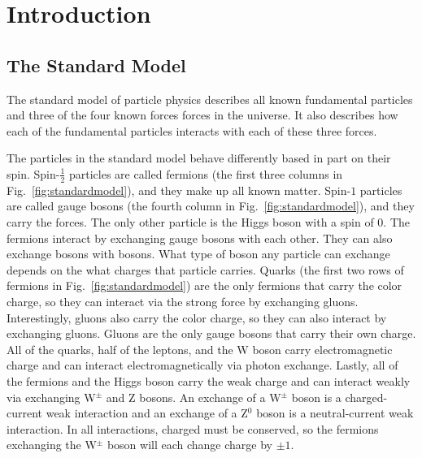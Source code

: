 \section{Introduction} \label{sec:intro}
\hspace{\parindent}

\subsection{The Standard Model}\label{sec:standardmodel}
  The standard model of particle physics describes all known fundamental
  particles and three of the four known forces forces in the universe. It also
  describes how each of the fundamental particles interacts with each of these
  three forces.

  The particles in the standard model behave differently based in part on their
  spin. Spin-$\frac{1}{2}$ particles are called fermions (the first three
  columns in Fig.~\ref{fig:standardmodel}), and they make up all known matter.
  Spin-$1$ particles are called gauge bosons (the fourth column in
  Fig.~\ref{fig:standardmodel}), and they carry the forces.  The only other
  particle is the Higgs boson with a spin of $0$. The fermions interact by
  exchanging gauge bosons with each other. They can also exchange bosons with
  bosons. What type of boson any particle can exchange depends on the what
  charges that particle carries. Quarks (the first two rows of fermions in
  Fig.~\ref{fig:standardmodel}) are the only fermions that carry the color
  charge, so they can interact via the strong force by exchanging gluons.
  Interestingly, gluons also carry the color charge, so they can also interact
  by exchanging gluons. Gluons are the only gauge bosons that carry their own
  charge. All of the quarks, half of the leptons, and the W boson carry
  electromagnetic charge and can interact electromagnetically via photon
  exchange. Lastly, all of the fermions and the Higgs boson carry the weak
  charge and can interact weakly via exchanging W$^{\pm}$ and Z bosons. An
  exchange of a W$^{\pm}$ boson is a charged-current weak interaction and an
  exchange of a Z$^0$ boson is a neutral-current weak interaction. In all
  interactions, charged must be conserved, so the fermions exchanging the
  W$^{\pm}$ boson will each change charge by $\pm 1$.

